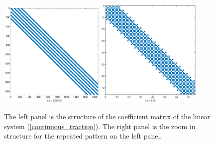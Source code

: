 \begin{figure}[H]
	\centering
	\includegraphics[width=0.45\textwidth,trim={1.2cm 1cm 1.4cm 1.2cm}, clip]{Mass_matrix.eps}
	\includegraphics[width=0.45\textwidth,trim={1.2cm 1cm 1.4cm 1.2cm}, clip]{Mass_diagonal_matrix.eps}
	\caption{The left panel is the structure of the coefficient matrix of the linear system (\ref{continuous_traction}). The right panel is the zoom in structure for the repeated pattern on the left panel.}\label{Mass_matrix}
\end{figure}
